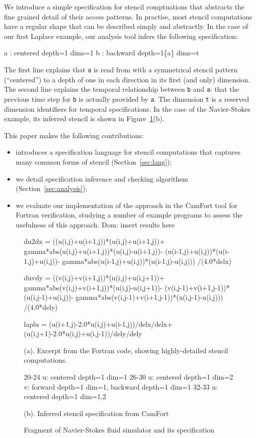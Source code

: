 \documentclass[10pt]{sigplanconf}
\newcommand{\dnote}[1]{\textcolor{darkpurple}{Dom: #1}}
\theoremstyle{definition}
\begin{document}
We introduce a simple specification for stencil comptuations
that abstracts the fine grained detail of their access patterns.
In practise, most stencil computations have a regular shape that
can be described simply and abstractly. In the case of our
first Laplace example, our analysis tool infers the following specification:
%
\begin{SpecVerbatim}
a : centered depth=1 dims=1
b : backward depth=1\{a\} dims=t
\end{SpecVerbatim}
%
The first line explains that \texttt{a} is read from
with a symmetrical stencil pattern (``centered'') to a depth
of one in each direction in its first (and only) dimension.
The second line explains the temporal relationship between
\texttt{b} and \texttt{a}: that the previous time step for \texttt{b}
is actually provided by \texttt{a}. The dimension \texttt{t} is a
reserved dimension identifiers for temporal specifications. In
the case of the Navier-Stokes example, its inferred stencil is shown
in Figure~\ref{ref:navier-stokes-fragment}(b).

This paper makes the following contributions:
%
\begin{itemize}
\item introduces a specification language for
stencil computations that captures many common forms
of stencil (Section~\ref{sec:lang});
\item we detail specification inference and checking
algorithsm (Section~\ref{sec:analysis});
\item we evaluate our implementation of the approach
in the CamFort tool for Fortran verification, studying
a number of example programs to assess the usefulness
of this approach.
\dnote{insert results here}
\end{itemize}
%

\begin{figure}
\begin{ExmVerbatim}[firstnumber=20]
du2dx = ((u(i,j)+u(i+1,j))*(u(i,j)+u(i+1,j))+ 
    gamma*abs(u(i,j)+u(i+1,j))*(u(i,j)-u(i+1,j))- 
    (u(i-1,j)+u(i,j))*(u(i-1,j)+u(i,j))- 
    gamma*abs(u(i-1,j)+u(i,j))*(u(i-1,j)-u(i,j))) 
    /(4.0*delx)

duvdy = ((v(i,j)+v(i+1,j))*(u(i,j)+u(i,j+1))+ 
   gamma*abs(v(i,j)+v(i+1,j))*(u(i,j)-u(i,j+1))- 
   (v(i,j-1)+v(i+1,j-1))*(u(i,j-1)+u(i,j))-  
   gamma*abs(v(i,j-1)+v(i+1,j-1))*(u(i,j-1)-u(i,j))) 
   /(4.0*dely)

laplu = (u(i+1,j)-2.0*u(i,j)+u(i-1,j))/delx/delx+ 
          (u(i,j+1)-2.0*u(i,j)+u(i,j-1))/dely/dely
\end{ExmVerbatim} 
(a). Excerpt from the Fortran code, 
showing highly-detailed stencil computations. \\

\begin{SpecVerbatim}[xleftmargin=0.1cm]
20-24  u: centered depth=1 dim=1
26-30  u: centered depth=1 dim=2
       v: forward depth=1 dim=1, backward depth=1 dim=1
32-33  u: centered depth=1 dim=1,2
\end{SpecVerbatim}
(b). Inferred stencil specification from CamFort
\caption{Fragment of Navier-Stokes fluid simulator and its specification}
\label{ref:navier-stokes-fragment}
\end{figure}
\end{document}
